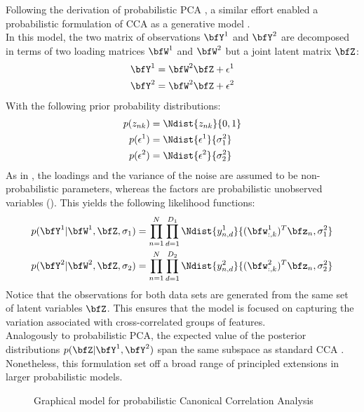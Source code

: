 Following the derivation of probabilistic PCA \cite{Tipping1999}, a similar effort enabled a probabilistic formulation of CCA as a generative model \cite{Bach2005}.\\
In this model, the two matrix of observations $\bfY^{1}$ and $\bfY^{2}$ are decomposed in terms of two loading matrices $\bfW^{1}$ and $\bfW^{2}$ but a joint latent matrix $\bfZ$:
\begin{align*}
	\bfY^{1} &= \bfW^{2} \bfZ + \epsilon^{1} \\
	\bfY^{2} &= \bfW^{2} \bfZ + \epsilon^{2}
\end{align*}
With the following prior probability distributions:
\begin{align*}
	p(z_{nk}) &= \Ndist{z_{nk}}{0,1} \\
	p(\epsilon^{1}) &= \Ndist {\epsilon^{1}}{\sigma_{1}^{2}} \\
	p(\epsilon^{2}) &= \Ndist {\epsilon^{2}}{\sigma_{2}^{2}} \\
\end{align*}
As in \cite{Tipping1999}, the loadings and the variance of the noise are assumed to be non-probabilistic parameters, whereas the factors are probabilistic unobserved variables (). This yields the following likelihood functions:
\begin{align*} \label{eq:probabilistic_cca_likelihood}
	p(\bfY^{1}|\bfW^{1},\bfZ,\sigma_{1}) &= \prod_{n=1}^{N} \prod_{d=1}^{D_1} \Ndist{y^{1}_{n,d}}{(\bfw_{:,k}^{1})^T \bfz_{n},\sigma_{1}^2} \\
	p(\bfY^{2}|\bfW^{2},\bfZ,\sigma_{2}) &= \prod_{n=1}^{N} \prod_{d=1}^{D_2} \Ndist{y^{2}_{n,d}}{(\bfw_{:,k}^{2})^T \bfz_{n},\sigma_{2}^2}
\end{align*}
Notice that the observations for both data sets are generated from the same set of latent variables $\bfZ$. This ensures that the model is focused on capturing the variation associated with cross-correlated groups of features.\\

Analogously to probabilistic PCA, the expected value of the posterior distributions $p(\bfZ|\bfY^{1},\bfY^{2})$ span the same subspace as standard CCA \cite{Bach2005}. Nonetheless, this formulation set off a broad range of principled extensions in larger probabilistic models.

\begin{figure}[H] \begin{center}
	
	\label{fig:graphical_CCA}
	\caption{Graphical model for probabilistic Canonical Correlation Analysis}
\end{center} \end{figure}

